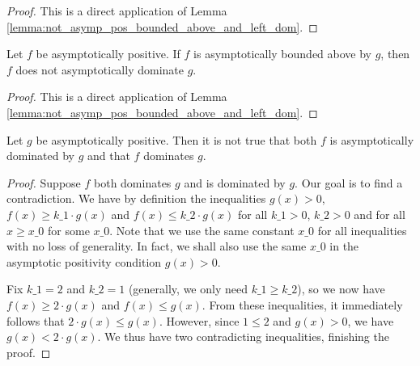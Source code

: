 \begin{proof}
    \leanok
    This is a direct application of Lemma \ref{lemma:not_asymp_pos_bounded_above_and_left_dom}. 
\end{proof}

\begin{theorem}
    \label{thm:not_asymp_bounded_above_of_left_dom_pos}
    \leanok
    Let $f$ be asymptotically positive. If $f$ is asymptotically bounded above by $g$, 
    then $f$ does not asymptotically dominate $g$.
\end{theorem}

\begin{proof}
    \leanok
    This is a direct application of Lemma \ref{lemma:not_asymp_pos_bounded_above_and_left_dom}. 
\end{proof}

\begin{lemma}
    \label{lemma:not_asymp_pos_left_and_right_dom}
    \leanok
    Let $g$ be asymptotically positive. Then it is not true that both $f$ is asymptotically
    dominated by $g$ and that $f$ dominates $g$.
\end{lemma}

\begin{proof}
    Suppose $f$ both dominates $g$ and is dominated by $g$. Our goal is to find a
    contradiction. We have by definition the inequalities $g(x) > 0$, 
    $f(x) \ge k\_1 \cdot g(x)$ and $f(x) \le k\_2 \cdot g(x)$ for all $k\_1 > 0$, 
    $k\_2 > 0$ and for all $x \ge x\_0$ for some $x\_0$. Note that we use the same 
    constant $x\_0$ for all inequalities with no loss of generality. In fact, we shall also use the same $x\_0$ 
    in the asymptotic positivity condition $g(x) > 0$.

    Fix $k\_1 = 2$ and $k\_2 = 1$ (generally, we only need $k\_1 \ge k\_2$), so we now have
    $f(x) \ge 2 \cdot g(x)$ and $f(x) \le g(x)$. From these inequalities, it immediately
    follows that $2 \cdot g(x) \le g(x)$. However, since $1 \le 2$ and $g(x) > 0$, we have
    $g(x) < 2 \cdot g(x)$. We thus have two contradicting inequalities, finishing the proof.
\end{proof}


